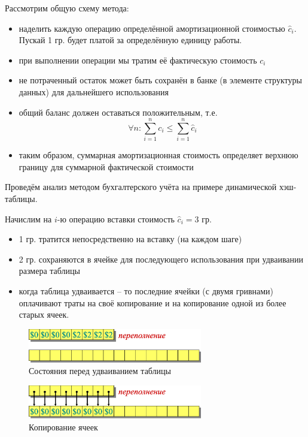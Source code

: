 \documentclass[a4paper,11pt]{article}
\begin{document}
Рассмотрим общую схему метода:

\begin{itemize}
\item наделить каждую операцию определённой амортизационной стоимостью
  $\hat{c}_i$. Пускай 1 гр. будет платой за определённую единицу работы.
\item при выполнении операции мы тратим её фактическую стоимость $c_i$
\item не потраченный остаток может быть сохранён в банке (в элементе структуры
  данных) для дальнейшего использования
\item общий баланс должен оставаться положительным, т.е.
$$ \forall{n}: \sum_{i=1}^n c_i \leqslant \sum_{i=1}^n \hat{c}_i $$
\item таким образом, суммарная амортизационная стоимость определяет верхнюю
  границу для суммарной фактической стоимости
\end{itemize}

Проведём анализ методом бухгалтерского учёта на примере динамической
хэш-таблицы.

Начислим на $i$-ю операцию вставки стоимость $\hat{c}_i = 3$ гр.
\begin{itemize}
\item 1 гр. тратится непосредственно на вставку (на каждом шаге)
\item 2 гр. сохраняются в ячейке для последующего использования при удваивании
  размера таблицы
\item когда таблица удваивается -- то последние ячейки (с двумя гривнами)
  оплачивают траты на своё копирование и на копирование одной из более старых ячеек.
\end{itemize}

\begin{figure}[ht]
  \centering
  \includegraphics[width=3in]{lecture13/accountant1.eps}
  \caption{Состояния перед удваиванием таблицы}
  \label{fig:acc1}
\end{figure}

\begin{figure}[ht]
  \centering
  \includegraphics[width=3in]{lecture13/accountant2.eps}
  \caption{Копирование ячеек}
  \label{fig:acc2}
\end{figure}
\end{document}
